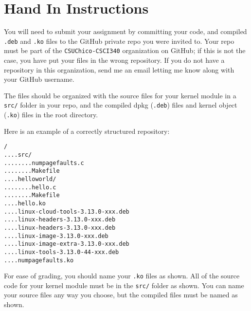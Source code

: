 \documentclass[11pt]{article}
\begin{document}
\newpage

\section*{Hand In Instructions}

You will need to submit your assignment by committing your code, and compiled {\tt .deb} and {\tt .ko} files to the GitHub private repo you were invited to. Your repo must be part of the {\tt CSUChico-CSCI340} organization on GitHub; if this is not the case, you have put your files in the wrong repository. If you do not have a repository in this organization, send me an email letting me know along with your GitHub username. 

The files should be organized with the source files for your kernel module in a {\tt src/} folder in your repo, and the compiled dpkg ({\tt .deb}) files and kernel object ({\tt .ko}) files in the root directory.  

Here is an example of a correctly structured repository:
\begin{verbatim}
/
....src/
........numpagefaults.c
........Makefile
....helloworld/
........hello.c
........Makefile
....hello.ko
....linux-cloud-tools-3.13.0-xxx.deb
....linux-headers-3.13.0-xxx.deb
....linux-headers-3.13.0-xxx.deb
....linux-image-3.13.0-xxx.deb
....linux-image-extra-3.13.0-xxx.deb
....linux-tools-3.13.0-44-xxx.deb
....numpagefaults.ko
\end{verbatim}

For ease of grading, you should name your {\tt .ko} files as shown. All of the source code for your kernel module must be in the {\tt src/} folder as shown. You can name your source files any way you choose, but the compiled files must be named as shown.
\newpage
\end{document}
